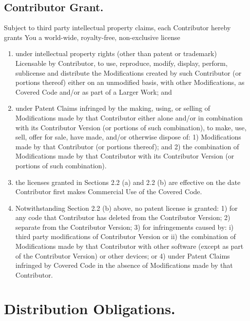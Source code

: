 \documentclass[letterpaper,colorlinks=true,linkcolor=blue]{book}
\begin{document}
\subsection{Contributor Grant.}
Subject to third party intellectual property claims, each Contributor hereby grants You a world-wide, royalty-free, non-exclusive license 
\begin{enumerate}
\item under intellectual property rights (other than patent or trademark) Licensable by Contributor, to use, reproduce, modify, display, perform, sublicense and distribute the Modifications created by such Contributor (or portions thereof) either on an unmodified basis, with other Modifications, as Covered Code and/or as part of a Larger Work; and 

\item under Patent Claims infringed by the making, using, or selling
  of Modifications made by that Contributor either alone and/or in
  combination with its Contributor Version (or portions of such
  combination), to make, use, sell, offer for sale, have made, and/or
  otherwise dispose of: 1) Modifications made by that Contributor (or
  portions thereof); and 2) the combination of Modifications made by
  that Contributor with its Contributor Version (or portions of such
  combination). 

\item the licenses granted in Sections 2.2 (a) and 2.2 (b) are effective on the date Contributor first makes Commercial Use of the Covered Code. 

\item Notwithstanding Section 2.2 (b) above, no patent license is granted: 1) for any code that Contributor has deleted from the Contributor Version; 2) separate from the Contributor Version; 3) for infringements caused by: i) third party modifications of Contributor Version or ii) the combination of Modifications made by that Contributor with other software (except as part of the Contributor Version) or other devices; or 4) under Patent Claims infringed by Covered Code in the absence of Modifications made by that Contributor. 
\end{enumerate}

\section{Distribution Obligations.}
\end{document}
